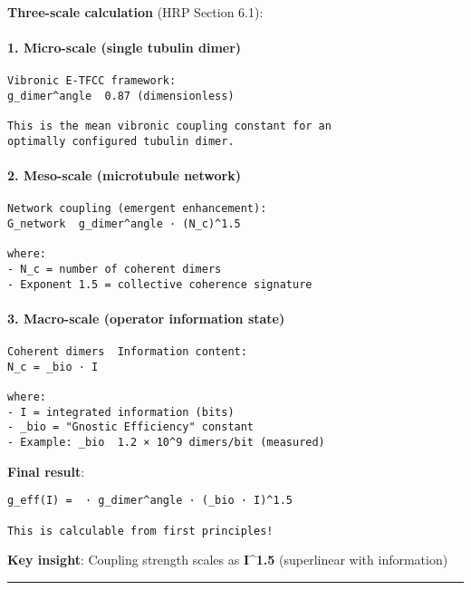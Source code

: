 \textbf{Three-scale calculation} (HRP Section 6.1):

\paragraph{1. Micro-scale (single tubulin
dimer)}\label{micro-scale-single-tubulin-dimer}

\begin{verbatim}
Vibronic E-TFCC framework:
g_dimer^angle  0.87 (dimensionless)

This is the mean vibronic coupling constant for an
optimally configured tubulin dimer.
\end{verbatim}

\paragraph{2. Meso-scale (microtubule
network)}\label{meso-scale-microtubule-network}

\begin{verbatim}
Network coupling (emergent enhancement):
G_network  g_dimer^angle · (N_c)^1.5

where:
- N_c = number of coherent dimers
- Exponent 1.5 = collective coherence signature
\end{verbatim}

\paragraph{3. Macro-scale (operator information
state)}\label{macro-scale-operator-information-state}

\begin{verbatim}
Coherent dimers  Information content:
N_c = _bio · I

where:
- I = integrated information (bits)
- _bio = "Gnostic Efficiency" constant
- Example: _bio  1.2 × 10^9 dimers/bit (measured)
\end{verbatim}

\textbf{Final result}:

\begin{verbatim}
g_eff(I) =  · g_dimer^angle · (_bio · I)^1.5

This is calculable from first principles!
\end{verbatim}

\textbf{Key insight}: Coupling strength scales as \textbf{I\^{}1.5}
(superlinear with information)

\begin{center}\rule{0.5\linewidth}{0.5pt}\end{center}

